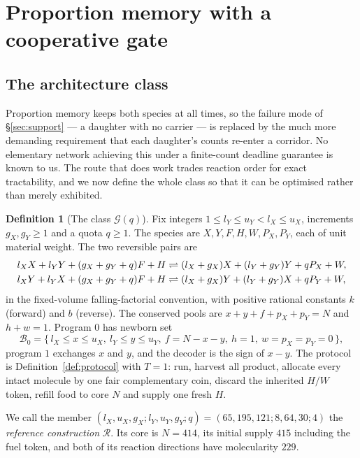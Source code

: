 \documentclass[11pt]{article}
\theoremstyle{plain}
\theoremstyle{definition}
\newtheorem{definition}[theorem]{Definition}
\theoremstyle{remark}
\begin{document}
\section{Proportion memory with a cooperative gate}\label{sec:proportion}

\subsection{The architecture class}

Proportion memory keeps both species at all times, so the failure mode of
\S\ref{sec:support} --- a daughter with no carrier --- is replaced by the much
more demanding requirement that each daughter's counts re-enter a corridor.
No elementary network achieving this under a finite-count deadline guarantee
is known to us. The route that does work trades reaction order for exact
tractability, and we now define the whole class so that it can be optimised
rather than merely exhibited.

\begin{definition}[The class $\mathcal{G}(q)$]\label{def:class}
Fix integers $1\le l_Y\le u_Y<l_X\le u_X$, increments $g_X,g_Y\ge1$ and a
quota $q\ge1$. The species are $X,Y,F,H,W,P_X,P_Y$, each of unit material
weight. The two reversible pairs are
\begin{align}
l_XX+l_YY+(g_X+g_Y+q)F+H
&\rightleftharpoons (l_X+g_X)X+(l_Y+g_Y)Y+qP_X+W, \label{eq:gate}\\
l_XY+l_YX+(g_X+g_Y+q)F+H
&\rightleftharpoons (l_X+g_X)Y+(l_Y+g_Y)X+qP_Y+W, \notag
\end{align}
in the fixed-volume falling-factorial convention, with positive rational
constants $k$ (forward) and $b$ (reverse). The conserved pools are
$x+y+f+p_X+p_Y=N$ and $h+w=1$. Program $0$ has newborn set
\begin{equation}\label{eq:newborn}
\mathcal{B}_0=\{\,l_X\le x\le u_X,\ l_Y\le y\le u_Y,\ f=N-x-y,\ h=1,\
w=p_X=p_Y=0\,\},
\end{equation}
program $1$ exchanges $x$ and $y$, and the decoder is the sign of $x-y$.
The protocol is Definition~\ref{def:protocol} with $T=1$: run, harvest all
product, allocate every intact molecule by one fair complementary coin,
discard the inherited $H/W$ token, refill food to core $N$ and supply one
fresh $H$.
\end{definition}

We call the member
$(l_X,u_X,g_X;l_Y,u_Y,g_Y;q)=(65,195,121;8,64,30;4)$ the \emph{reference
construction} $\mathcal{R}$. Its core is $N=414$, its initial supply $415$
including the fuel token, and both of its reaction directions have
molecularity $229$.
\end{document}

